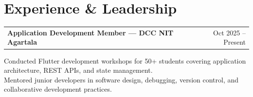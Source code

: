 \documentclass[a4paper,12pt]{article}
\makeatletter
\newenvironment{jobshort}[2]
    {
    \begin{tabularx}{\linewidth}{@{}l X r@{}}
    \textbf{#1} & \hfill &  #2 \\[3.75pt]
    \end{tabularx}
    }
    {
    }
\makeatother
\begin{document}
\section{Experience \& Leadership}

\begin{jobshort}{Application Development Member — DCC NIT Agartala}{Oct 2025 -- Present}
\textbullet{} Conducted Flutter development workshops for 50+ students covering application architecture, REST APIs, and state management.\\
\textbullet{} Mentored junior developers in software design, debugging, version control, and collaborative development practices.
\end{jobshort}



\vfill
{}
\end{document}
